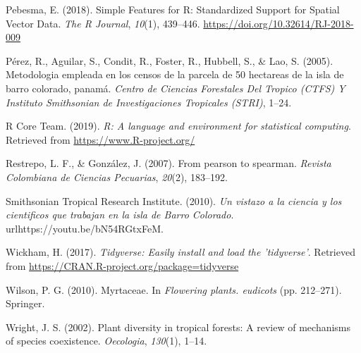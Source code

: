 \documentclass[11pt,]{article}
\begin{document}
\hypertarget{ref-sf}{}
Pebesma, E. (2018). Simple Features for R: Standardized Support for
Spatial Vector Data. \emph{The R Journal}, \emph{10}(1), 439--446.
\url{https://doi.org/10.32614/RJ-2018-009}

\hypertarget{ref-perez2005metodologia}{}
Pérez, R., Aguilar, S., Condit, R., Foster, R., Hubbell, S., \& Lao, S.
(2005). Metodologia empleada en los censos de la parcela de 50 hectareas
de la isla de barro colorado, panamá. \emph{Centro de Ciencias
Forestales Del Tropico (CTFS) Y Instituto Smithsonian de Investigaciones
Tropicales (STRI)}, 1--24.

\hypertarget{ref-citadeR}{}
R Core Team. (2019). \emph{R: A language and environment for statistical
computing}. Retrieved from \url{https://www.R-project.org/}

\hypertarget{ref-restrepo2007pearson}{}
Restrepo, L. F., \& González, J. (2007). From pearson to spearman.
\emph{Revista Colombiana de Ciencias Pecuarias}, \emph{20}(2), 183--192.

\hypertarget{ref-bci_video}{}
Smithsonian Tropical Research Institute. (2010). \emph{Un vistazo a la
ciencia y los cientificos que trabajan en la isla de Barro Colorado}.
urlhttps://youtu.be/bN54RGtxFeM.

\hypertarget{ref-tidyverse}{}
Wickham, H. (2017). \emph{Tidyverse: Easily install and load the
'tidyverse'}. Retrieved from
\url{https://CRAN.R-project.org/package=tidyverse}

\hypertarget{ref-wilson2010myrtaceae}{}
Wilson, P. G. (2010). Myrtaceae. In \emph{Flowering plants. eudicots}
(pp. 212--271). Springer.

\hypertarget{ref-wright2002plant}{}
Wright, J. S. (2002). Plant diversity in tropical forests: A review of
mechanisms of species coexistence. \emph{Oecologia}, \emph{130}(1),
1--14.




\newpage
\singlespacing 
\end{document}
